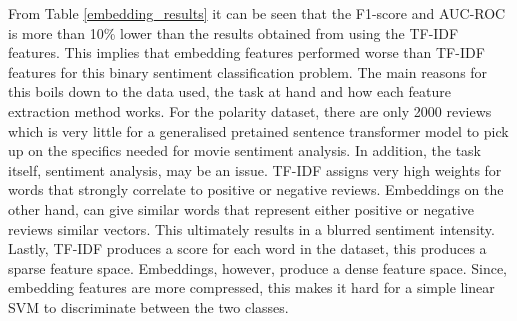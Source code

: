 \begin{enumerate}[label=\roman*., topsep=0pt, itemsep=2pt]
        From Table \ref{embedding_results} it can be seen that the F1-score and AUC-ROC is more than 10\% lower than the results obtained from using the TF-IDF features. This implies that
        embedding features performed worse than TF-IDF features for this binary sentiment classification problem. The main reasons for this boils down to the data used, the task at hand and
        how each feature extraction method works. For the polarity dataset, there are only 2000 reviews which is very little for a generalised pretained sentence transformer model to pick
        up on the specifics needed for movie sentiment analysis. In addition, the task itself, sentiment analysis, may be an issue. TF-IDF assigns very high weights for words that strongly
        correlate to positive or negative reviews. Embeddings on the other hand, can give similar words that represent either positive or negative reviews similar vectors. This ultimately
        results in a blurred sentiment intensity. Lastly, TF-IDF produces a score for each word in the dataset, this produces a sparse feature space. 
        Embeddings, however, produce a dense feature space. Since, embedding features are more compressed, this makes it hard for a simple linear SVM to discriminate between the two classes.

\end{enumerate}